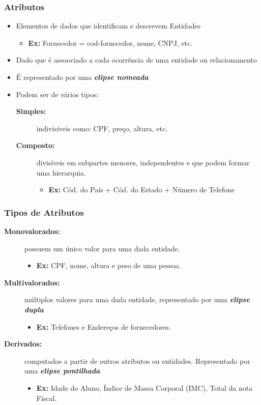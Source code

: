 \documentclass[12pt,a4paper]{article}
\begin{document}
\subsubsection{Atributos}
\begin{itemize}
    \item Elementos de dados que identificam e descrevem Entidades
        \begin{itemize}
            \item \textbf{Ex:} Fornecedor = cod-fornecedor, nome, CNPJ, etc.
        \end{itemize}
    \item Dado que é assoociado a cada ocorrência de uma entidade ou relacionamento
    \item É representado por uma \textbf{\textit{elipse nomeada}}
    \item Podem ser de vários tipos:
        \begin{description}
            \item[\textbf{Simples:}] indivisíveis como: CPF, preço, altura, etc.
            \item[\textbf{Composto:}] divisíveis em subpartes menores, independentes e que podem formar uma hierarquia.
                \begin{itemize}
                    \item \textbf{Ex:} Cód. do País + Cód. do Estado + Número de Telefone
                \end{itemize}
        \end{description}
\end{itemize}

\subsubsection{Tipos de Atributos}
\begin{description}
    \item[\textbf{Monovalorados:}]
        possuem um único valor para uma dada entidade.
        \begin{itemize}\item \textbf{Ex:} CPF, nome, altura e peso de uma pessoa.\end{itemize}
    \item[\textbf{Multivalorados:}]
        múltiplos valores para uma dada entidade, representado por uma \textit\textbf{elipse dupla}
        \begin{itemize}
            \item \textbf{Ex:} Telefones e Endereços de fornecedores.
        \end{itemize}
    \item[\textbf{Derivados:}] computados a partir de outros atributos ou entidades. Representado por uma \textbf{\textit{elipse pontilhada}}
        \begin{itemize}
            \item \textbf{Ex:} Idade do Aluno, Índice de Massa Corporal (IMC), Total da nota Fiscal.
        \end{itemize}
\end{description}
\end{document}
